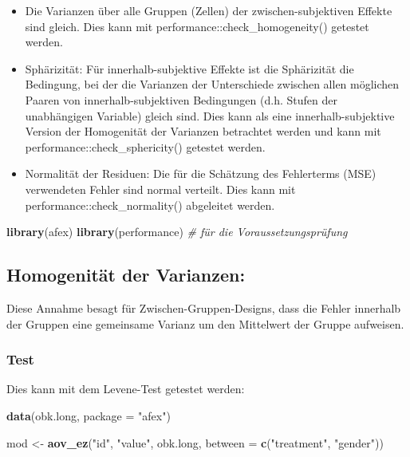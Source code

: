 \documentclass[
]{book}
\newenvironment{Shaded}{\begin{snugshade}}{\end{snugshade}}
\newcommand{\AttributeTok}[1]{\textcolor[rgb]{0.13,0.29,0.53}{#1}}
\newcommand{\CommentTok}[1]{\textcolor[rgb]{0.56,0.35,0.01}{\textit{#1}}}
\newcommand{\FunctionTok}[1]{\textcolor[rgb]{0.13,0.29,0.53}{\textbf{#1}}}
\newcommand{\NormalTok}[1]{#1}
\newcommand{\OtherTok}[1]{\textcolor[rgb]{0.56,0.35,0.01}{#1}}
\newcommand{\StringTok}[1]{\textcolor[rgb]{0.31,0.60,0.02}{#1}}
\providecommand{\tightlist}{%
  \setlength{\itemsep}{0pt}\setlength{\parskip}{0pt}}
\begin{document}
\begin{itemize}
\tightlist
\item
  Die Varianzen über alle Gruppen (Zellen) der zwischen-subjektiven Effekte sind gleich. Dies kann mit performance::check\_homogeneity() getestet werden.
\item
  Sphärizität: Für innerhalb-subjektive Effekte ist die Sphärizität die Bedingung, bei der die Varianzen der Unterschiede zwischen allen möglichen Paaren von innerhalb-subjektiven Bedingungen (d.h. Stufen der unabhängigen Variable) gleich sind. Dies kann als eine innerhalb-subjektive Version der Homogenität der Varianzen betrachtet werden und kann mit performance::check\_sphericity() getestet werden.
\item
  Normalität der Residuen: Die für die Schätzung des Fehlerterms (MSE) verwendeten Fehler sind normal verteilt. Dies kann mit performance::check\_normality() abgeleitet werden.
\end{itemize}

\begin{Shaded}
\begin{Highlighting}[]
\FunctionTok{library}\NormalTok{(afex)}
\FunctionTok{library}\NormalTok{(performance) }\CommentTok{\# für die Voraussetzungsprüfung}
\end{Highlighting}
\end{Shaded}

\subsection{Homogenität der Varianzen:}\label{homogenituxe4t-der-varianzen}

Diese Annahme besagt für Zwischen-Gruppen-Designs, dass die Fehler innerhalb der Gruppen eine gemeinsame Varianz um den Mittelwert der Gruppe aufweisen.

\subsubsection{Test}\label{test}

Dies kann mit dem Levene-Test getestet werden:

\begin{Shaded}
\begin{Highlighting}[]
\FunctionTok{data}\NormalTok{(obk.long, }\AttributeTok{package =} \StringTok{"afex"}\NormalTok{)}

\NormalTok{mod }\OtherTok{\textless{}{-}} \FunctionTok{aov\_ez}\NormalTok{(}\StringTok{"id"}\NormalTok{, }\StringTok{"value"}\NormalTok{, obk.long, }
             \AttributeTok{between =} \FunctionTok{c}\NormalTok{(}\StringTok{"treatment"}\NormalTok{, }\StringTok{"gender"}\NormalTok{))}
\end{Highlighting}
\end{Shaded}
\end{document}
